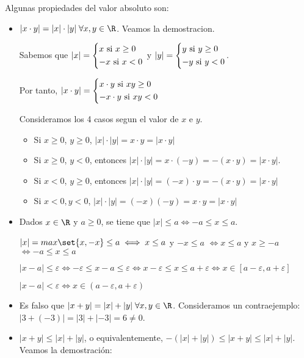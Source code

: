 Algunas propiedades del valor absoluto son:
\begin{itemize}
	\item \(|x \cdot y | = |x| \cdot |y| \; \forall x,y \in \R \). Veamos la demostracion.

	      Sabemos que \(|x| = \begin{dcases}
		      x \text{ si } x \geq 0 \\
		      - x \text{ si } x < 0
	      \end{dcases}\) y \(|y| = \begin{dcases}
		      y \text{ si } y \geq 0 \\
		      - y \text{ si } y < 0
	      \end{dcases}\).

	      Por tanto, \(|x \cdot y| = \begin{dcases}
		      x \cdot y \text{ si } xy \geq 0 \\
		      -x \cdot y \text{ si } xy < 0
	      \end{dcases}\)

	      Consideramos los 4 casos segun el valor de \(x \) e \(y \).

	      \begin{itemize}
		      \item Si \(x \geq 0\), \(y \geq 0 \), \(|x| \cdot |y| = x \cdot y = |x \cdot y| \)
		      \item Si \(x \geq 0 \), \(y < 0 \), entonces \(|x| \cdot |y| = x \cdot (-y) = -(x\cdot y) = |x \cdot y|\).
		      \item Si \(x < 0\), \(y \geq 0 \), entonces \(|x| \cdot |y| = (-x) \cdot y = -(x \cdot y) = |x \cdot y|\)
		      \item Si \(x < 0, y < 0 \), \(|x| \cdot |y| = (-x) (-y) = x \cdot y = |x \cdot y | \)
	      \end{itemize}
	\item Dados \(x \in \R \) y \(a \geq  0 \), se tiene que \(|x| \leq a \iff -a \leq x \leq a \).

	      \(|x| = max\set{x,-x} \leq a \iff  x \leq a \) y \(-x \leq a \) \(\iff  x \leq a \) y \(x \geq -a \) \(\iff -a \leq x \leq a \)

	      \begin{example}
		      \(|x - a| \leq \varepsilon \iff - \varepsilon \leq x - a \leq \varepsilon \iff x - \varepsilon \leq x \leq a + \varepsilon \iff x \in [a - \varepsilon, a + \varepsilon]\)

		      \(|x - a | < \varepsilon \iff x \in (a - \varepsilon, a  + \varepsilon)\)
	      \end{example}
	\item Es falso que \(|x + y | = |x | + |y| \; \forall x,y \in \R \). Consideramos un contraejemplo: \(|3 + (-3) | = |3| + |-3| = 6 \neq 0\).
	\item \(|x + y| \leq |x | + |y| \), o equivalentemente, \(-(|x| + |y|) \leq |x + y| \leq |x| + |y| \). Veamos la demostración:


\end{itemize}
